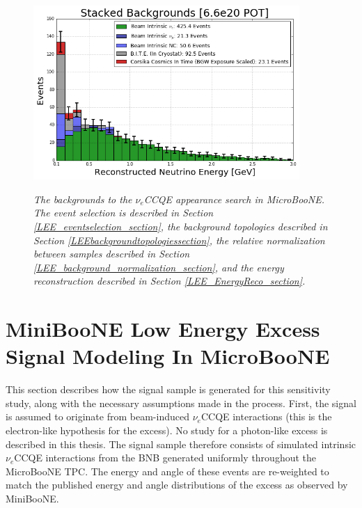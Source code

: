\begin{figure}[ht!]
\centering
\includegraphics[width=0.9\textwidth]{Figures/LEE_stackedbackgrounds_nosignal_withAnalysisCuts.png}\\
\caption{\textit{The backgrounds to the $\nu_e$CCQE appearance search in MicroBooNE. The event selection is described in Section \ref{LEE_eventselection_section}, the background topologies described in Section \ref{LEEbackgroundtopologiessection}, the relative normalization between samples described in Section \ref{LEE_background_normalization_section}, and the energy reconstruction described in Section \ref{LEE_EnergyReco_section}.}}
\label{LEE_stackedbackgrounds_nosignal_withanalysiscuts_fig}
\end{figure}





\section{MiniBooNE Low Energy Excess Signal Modeling In MicroBooNE}\label{MBLEESignalModeling_section}
This section describes how the signal sample is generated for this sensitivity study, along with the necessary assumptions made in the process. First, the signal is assumed to originate from beam-induced $\nu_e$CCQE interactions (this is the electron-like hypothesis for the excess). No study for a photon-like excess is described in this thesis. The signal sample therefore consists of simulated intrinsic $\nu_e$CCQE interactions from the BNB generated uniformly throughout the MicroBooNE TPC. The energy and angle of these events are re-weighted to match the published energy and angle distributions of the excess as observed by MiniBooNE. \\


